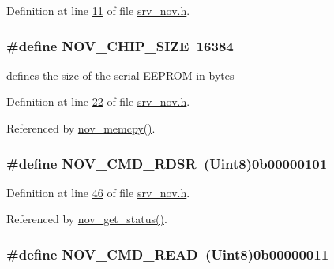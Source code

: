 Definition at line \hyperlink{a00029_source_l00011}{11} of file \hyperlink{a00029_source}{srv\+\_\+nov.\+h}.

\hypertarget{a00029_acbac04a78072f0322171ea94017f246e}{
\subsubsection[{N\+O\+V\+\_\+\+C\+H\+I\+P\+\_\+\+S\+I\+Z\+E}]{\setlength{\rightskip}{0pt plus 5cm}\#define N\+O\+V\+\_\+\+C\+H\+I\+P\+\_\+\+S\+I\+Z\+E~16384}}\label{a00029_acbac04a78072f0322171ea94017f246e}


defines the size of the serial E\+E\+P\+R\+O\+M in bytes 



Definition at line \hyperlink{a00029_source_l00022}{22} of file \hyperlink{a00029_source}{srv\+\_\+nov.\+h}.



Referenced by \hyperlink{a00060_source_l00723}{nov\+\_\+memcpy()}.

\hypertarget{a00029_a55309727a3055fdebf8df6e9d0f72fea}{
\subsubsection[{N\+O\+V\+\_\+\+C\+M\+D\+\_\+\+R\+D\+S\+R}]{\setlength{\rightskip}{0pt plus 5cm}\#define N\+O\+V\+\_\+\+C\+M\+D\+\_\+\+R\+D\+S\+R~({\bf Uint8})0b00000101}}\label{a00029_a55309727a3055fdebf8df6e9d0f72fea}


Definition at line \hyperlink{a00029_source_l00046}{46} of file \hyperlink{a00029_source}{srv\+\_\+nov.\+h}.



Referenced by \hyperlink{a00060_source_l00567}{nov\+\_\+get\+\_\+status()}.

\hypertarget{a00029_a9d4dca4a65e8cabd1d733922725309e4}{
\subsubsection[{N\+O\+V\+\_\+\+C\+M\+D\+\_\+\+R\+E\+A\+D}]{\setlength{\rightskip}{0pt plus 5cm}\#define N\+O\+V\+\_\+\+C\+M\+D\+\_\+\+R\+E\+A\+D~({\bf Uint8})0b00000011}}\label{a00029_a9d4dca4a65e8cabd1d733922725309e4}


